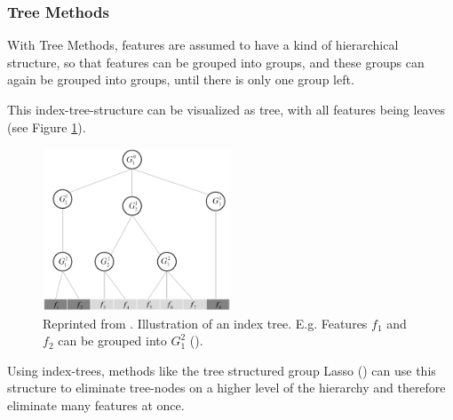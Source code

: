 \subsubsection{Tree Methods}
\label{sec:methods.structured.tree}


With Tree Methods, features are assumed to have a kind of hierarchical structure, 
so that features can be grouped into groups, and these groups can again be grouped into
groups, until there is only one group left.

This index-tree-structure can be visualized as tree, with all features being
leaves (see Figure \ref{fig:methods.structured.tree.lasso}).

\begin{figure}[!ht]
  \centering 
  \includegraphics[width=0.5\textwidth]{chapters/methods/structured/tree_lasso}
  \caption{Reprinted from \cite{Tang:14}. Illustration of an index tree.
  E.g. Features $f_1$ and $f_2$ can be grouped into $G_1^2$ (\cite{Tang:14}).}
  \label{fig:methods.structured.tree.lasso}
\end{figure}

Using index-trees, methods like the tree structured group Lasso (\cite{Kim:10})
can use this structure to eliminate tree-nodes on a higher level of the hierarchy and
therefore eliminate many features at once.